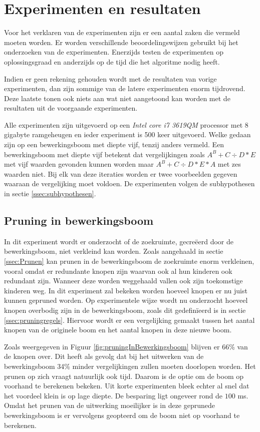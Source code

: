 \documentclass[Main.tex]{subfiles}
\begin{document}
\section{Experimenten en resultaten}
Voor het verklaren van de experimenten zijn er een aantal zaken die vermeld moeten worden. Er worden verschillende beoordelingswijzen gebruikt bij het onderzoeken van de experimenten. Enerzijds testen de experimenten op oplossingsgraad en anderzijds op de tijd die het algoritme nodig heeft. 
\par Indien er geen rekening gehouden wordt met de resultaten van vorige experimenten, dan zijn sommige van de latere experimenten enorm tijdrovend. Deze laatste tonen ook niets aan wat niet aangetoond kan worden met de resultaten uit de voorgaande experimenten. \par Alle experimenten zijn uitgevoerd op een \textit{Intel core i7 3619QM} processor met 8 gigabyte ramgeheugen en ieder experiment is 500 keer uitgevoerd. Welke gedaan zijn op een bewerkingsboom met diepte vijf, tenzij anders vermeld. Een bewerkingsboom met diepte vijf betekent dat vergelijkingen zoals $A^{B}+C \div D \ast E$ met vijf waarden gevonden kunnen worden maar $A^{B}+C \div D \ast E \ast A$ met zes waarden niet. Bij elk van deze iteraties worden er twee voorbeelden gegeven waaraan de vergelijking moet voldoen. De experimenten volgen de subhypothesen in sectie \ref{ssec:subhypothesen}.  

\subsection{Pruning in bewerkingsboom} \label{ssec:pruning}
In dit experiment wordt er onderzocht of de zoekruimte, gecre\"eerd door de bewerkingsboom, niet verkleind kan worden. Zoals aangehaald in sectie \ref{ssec:Prunen} kan prunen in de bewerkingsboom de zoekruimte enorm verkleinen, vooral omdat er redundante knopen zijn waarvan ook al hun kinderen ook redundant zijn. Wanneer deze worden weggehaald vallen ook zijn toekomstige kinderen weg. In dit experiment zal bekeken worden hoeveel knopen er nu juist kunnen gepruned worden. Op experimentele wijze wordt nu onderzocht hoeveel knopen overbodig zijn in de bewerkingsboom, zoals dit gedefin\"ieerd is in sectie \ref{ssec:pruningregels}. Hiervoor wordt er een vergelijking gemaakt tussen het aantal knopen van de originele boom en het aantal knopen in deze nieuwe boom.
\par Zoals weergegeven in Figuur \ref{fig:pruningInBewerkingsboom} blijven er 66\% van de knopen over. Dit heeft als gevolg dat bij het uitwerken van de bewerkingsboom 34\% minder vergelijkingen zullen moeten doorlopen worden. Het prunen op zich vraagt natuurlijk ook tijd. Daarom is de optie om de boom op voorhand te berekenen bekeken. Uit korte experimenten bleek echter al snel dat het voordeel klein is op lage diepte. De besparing ligt ongeveer rond de $100$ ms. Omdat het prunen van de uitwerking moeilijker is in deze geprunede bewerkingsboom is er vervolgens geopteerd om de boom niet op voorhand te berekenen.
\end{document}
